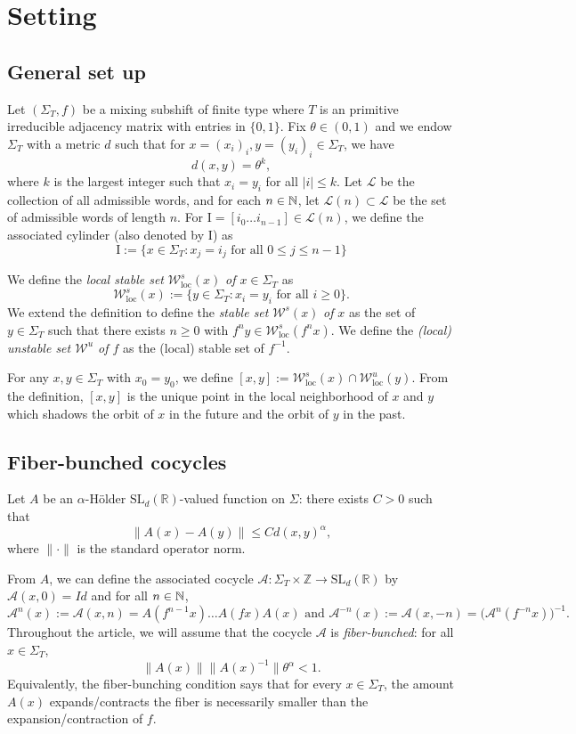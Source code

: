 \documentclass[11pt,oneside,reqno]{amsart}
\numberwithin{equation}{section}
\numberwithin{figure}{section}
\theoremstyle{definition}
\theoremstyle{definition}
\theoremstyle{definition}
\theoremstyle{definition}
\theoremstyle{remark}
\theoremstyle{definition}
\theoremstyle{definition}
\theoremstyle{definition}
\def\A{\mathcal{A}}
\def\L{\mathcal{L}}
\def\R{\mathbb{R}}
\def\I{\mathrm{I}}
\def\W{\mathcal{W}}
\def\hol{H\"older }
\newcommand{\Wloc}{\mathcal{W}_{\text{loc}}}
\newcommand{\Sig}{\Sigma_T}
\newcommand{\slr}{\text{SL}_d(\R)}
\begin{document}
\section{Setting}
\subsection{General set up}
Let $(\Sig,f)$ be a mixing subshift of finite type where $T$ is an primitive irreducible adjacency matrix with entries in $\{0,1\}$. Fix $\theta \in (0,1)$ and we endow $\Sig$ with a metric $d$ such that for $x = (x_i)_i,y = (y_i)_i \in \Sig$, we have
$$d(x,y)  = \theta^k,$$ 
where $k$ is the largest integer such that $x_i = y_i$ for all $|i| \leq k$. Let $\L$ be the collection of all admissible words, and for each $n \in \mathbb{N}$, let $\L(n) \subset \L$ be the set of admissible words of length $n$. For $\I = [i_0\ldots i_{n-1}] \in \L(n)$, we define the associated cylinder (also denoted by $\I$) as 
$$\I:=\{x \in \Sig \colon x_j = i_j \text{ for all } 0 \leq j \leq n-1\}$$ 

We define the \textit{local stable set} $\Wloc^s(x)$ \textit{of $x \in \Sig$} as 
$$\Wloc^s(x):=\{y \in \Sig \colon x_i = y_i \text{ for all } i \geq 0\}.$$
We extend the definition to define the \textit{stable set} $\W^s(x)$ \textit{of} $x$ as the set of $y \in \Sig$ such that there exists $n \geq 0$ with $f^ny \in \Wloc^s(f^nx)$. We define the \textit{(local) unstable set $\W^u$ of $f$} as the (local) stable set of $f^{-1}$.

For any $x,y\in \Sig$ with $x_0 = y_0$, we define $[x,y]:=\Wloc^s(x) \cap \Wloc^u(y)$. From the definition, $[x,y]$ is the unique point in the local neighborhood of $x$ and $y$ which shadows the orbit of $x$ in the future and the orbit of $y$ in the past.

\subsection{Fiber-bunched cocycles}
Let $A$ be an $\alpha$-\hol $\slr$-valued function on $\Sigma$: there exists $C>0$ such that
$$\|A(x)-A(y)\|  \leq Cd(x,y)^\alpha,$$
where $\|\cdot \|$ is the standard operator norm. 

From $A$, we can define the associated cocycle $\A \colon \Sig \times \mathbb{Z} \to \slr$ by $\A(x,0) = Id$ and for all $n \in \mathbb{N}$,
$$\A^n(x):=\A(x,n) = A(f^{n-1}x)\ldots A(fx)A(x) \text{ and }\A^{-n}(x) := \A(x,-n) = \big(\A^n(f^{-n}x)\big)^{-1}.$$
Throughout the article, we will assume that the cocycle $\A$ is \textit{fiber-bunched}: for all $x\in \Sig$,
$$\|A(x)\|\|A(x)^{-1}\| \theta^\alpha <1.$$ 
Equivalently, the fiber-bunching condition says that for every $x \in \Sig$, the amount $A(x)$ expands/contracts the fiber is necessarily smaller than the expansion/contraction of $f$. 
\end{document}

